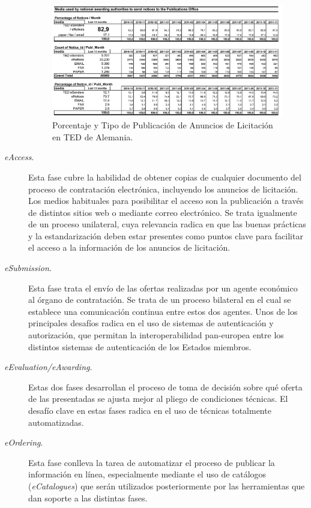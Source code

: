 \begin{description}
 \begin{figure}[!htb]
\centering
	\includegraphics[width=16cm]{images/phd/eproc/circa-5}
\caption{Porcentaje y Tipo de Publicación de Anuncios de Licitación en TED de Alemania.}
\label{fig:circa-5}
\end{figure}


\item [\textit{eAccess}.] Esta fase cubre la habilidad de obtener copias de cualquier documento del 
proceso de contratación electrónica, incluyendo los anuncios de licitación. Los medios habituales
para posibilitar el acceso son la publicación a través de distintos sitios web o mediante correo
electrónico. Se trata igualmente de un proceso unilateral, cuya relevancia radica
en que las buenas prácticas y la estandarización deben estar presentes como puntos clave
para facilitar el acceso a la información de los anuncios de licitación.


\item [\textit{eSubmission}.] Esta fase trata el envío de las ofertas realizadas por un agente
económico al órgano de contratación. Se trata de un proceso bilateral en el cual se establece
una comunicación continua entre estos dos agentes. Unos de los principales desafíos radica
en el uso de sistemas de autenticación y autorización, que permitan la interoperabilidad
pan-europea entre los distintos sistemas de autenticación de los Estados miembros.

\item [\textit{eEvaluation/eAwarding}.] Estas dos fases desarrollan el proceso de toma de decisión
sobre qué oferta de las presentadas se ajusta mejor al pliego de condiciones técnicas. El desafío
clave en estas fases radica en el uso de técnicas totalmente automatizadas.

\item [\textit{eOrdering}.] Esta fase conlleva la tarea de automatizar el proceso de publicar la información
en línea, especialmente mediante el uso de catálogos (\textit{eCatalogues}) que serán utilizados
posteriormente por las herramientas que dan soporte a las distintas fases.


\end{description}
